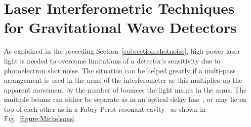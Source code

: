\documentclass{article}
\begin{document}

\newpage

\section{Laser Interferometric Techniques for Gravitational Wave Detectors}
\label{section:interferometry}

As explained in the preceding Section~\ref{subsection:shotnoise},
high power laser light is needed to overcome limitations of a
detector's sensitivity due to photoelectron shot noise. The situation
can be helped greatly if a multi-pass arrangement is used in the arms
of the interferometer as this multiplies up the apparent movement by
the number of bounces the light makes in the arms. The multiple beams
can either be separate as in an optical delay line~\cite{Weiss,
  Billing}, or may lie on top of each other as in a Fabry-Perot
resonant cavity~\cite{Drever2} as shown in
Fig.~\ref{figure:Michelsons}.
\end{document}
